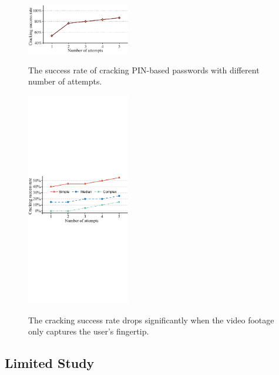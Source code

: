     \begin{figure}[!t]
        \centering
        \includegraphics[width=0.4\textwidth]{fig/pin_results.eps}\\
        \vspace{-3mm}
        \caption{The success rate of cracking PIN-based passwords with different number of attempts.}
        \label{fig:pin_results}
        \vspace{-3mm}
    \end{figure}

    \begin{figure}[!t]
        \centering
        \includegraphics[width=0.4\textwidth]{fig/finger-only.pdf}\\
        \vspace{-3mm}
        \caption{The cracking success rate drops significantly when the video footage only captures the user's fingertip.}
        \label{fig:finger-only}
        \vspace{-6mm}
    \end{figure}

\vspace{-4mm}
\subsection{Limited Study}
\label{section: limited-study}

